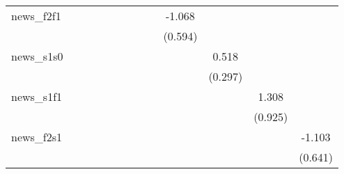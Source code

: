 {\begin{tabular}{l*{12}{c}}
\addlinespace
news\_f2f1   &                     &                     &                     &                     &                     &                     &                     &                     &      -1.068\sym{*}  &                     &                     &                     \\
            &                     &                     &                     &                     &                     &                     &                     &                     &     (0.594)         &                     &                     &                     \\
\addlinespace
news\_s1s0   &                     &                     &                     &                     &                     &                     &                     &                     &                     &       0.518\sym{*}  &                     &                     \\
            &                     &                     &                     &                     &                     &                     &                     &                     &                     &     (0.297)         &                     &                     \\
\addlinespace
news\_s1f1   &                     &                     &                     &                     &                     &                     &                     &                     &                     &                     &       1.308         &                     \\
            &                     &                     &                     &                     &                     &                     &                     &                     &                     &                     &     (0.925)         &                     \\
\addlinespace
news\_f2s1   &                     &                     &                     &                     &                     &                     &                     &                     &                     &                     &                     &      -1.103\sym{*}  \\
            &                     &                     &                     &                     &                     &                     &                     &                     &                     &                     &                     &     (0.641)         \\

\end{tabular}}
